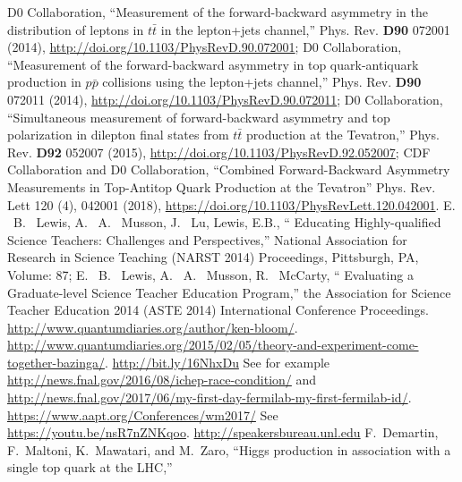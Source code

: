 \begin{thebibliography}{99}
%
%
%
D0 Collaboration, ``Measurement of the forward-backward asymmetry in the distribution of leptons in $t\bar{t}$ in the lepton+jets channel,'' Phys. Rev. {\bf D90} 072001 (2014), \url{http://doi.org/10.1103/PhysRevD.90.072001};
D0 Collaboration, ``Measurement of the forward-backward asymmetry in top quark-antiquark production in $p\bar{p}$ collisions using the lepton+jets channel,'' Phys. Rev. {\bf D90} 072011 (2014), \url{http://doi.org/10.1103/PhysRevD.90.072011};
D0 Collaboration, ``Simultaneous measurement of forward-backward asymmetry and top polarization in dilepton final states from $t\bar{t}$ production at the Tevatron,'' Phys. Rev. {\bf D92} 052007 (2015), \url{http://doi.org/10.1103/PhysRevD.92.052007};
CDF Collaboration and D0 Collaboration, ``Combined Forward-Backward Asymmetry Measurements in Top-Antitop Quark Production at the Tevatron'' Phys. Rev. Lett 120 (4), 042001 (2018), \url{https://doi.org/10.1103/PhysRevLett.120.042001}.
%
%
E. ~B. ~Lewis, A. ~A. ~Musson, J. ~Lu, Lewis, E.B., `` Educating Highly-qualified Science Teachers: Challenges and Perspectives,” National Association for Research in Science Teaching (NARST 2014) Proceedings, Pittsburgh, PA, Volume: 87; 
E. ~B. ~Lewis, A. ~A. ~Musson, R. ~McCarty, `` Evaluating a Graduate-level Science Teacher Education Program,” the Association for Science Teacher Education 2014 (ASTE 2014) International Conference Proceedings.
%
 \url{http://www.quantumdiaries.org/author/ken-bloom/}.
%
 \url{http://www.quantumdiaries.org/2015/02/05/theory-and-experiment-come-together-bazinga/}.
%
 \url{http://bit.ly/16NhxDu}
%
 See for example \url{http://news.fnal.gov/2016/08/ichep-race-condition/} and \url{http://news.fnal.gov/2017/06/my-first-day-fermilab-my-first-fermilab-id/}.
%
 \url{https://www.aapt.org/Conferences/wm2017/}
%
 See \url{https://youtu.be/nsR7nZNKqoo}.
%
 \url{http://speakersbureau.unl.edu}
%
 F.~Demartin, F.~Maltoni, K.~Mawatari, and M.~Zaro,
  ``Higgs production in association with a single top quark at the LHC,''

\end{thebibliography}
